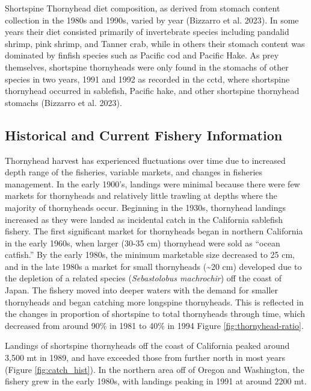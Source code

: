 \documentclass[11pt,
  english,
  letterpaper,
]{article}
\begin{document}
Shortspine Thornyhead diet composition, as derived from stomach content collection in the 1980s and 1990s, varied by year (Bizzarro et al. 2023). In some years their diet consisted primarily of invertebrate species including pandalid shrimp, pink shrimp, and Tanner crab, while in others their stomach content was dominated by finfish species such as Pacific cod and Pacific Hake. As prey themselves, shortspine thornyheads were only found in the stomachs of other species in two years, 1991 and 1992 as recorded in the \gls{cctd}, where shortspine thornyhead occurred in sablefish, Pacific hake, and other shortspine thornyhead stomachs (Bizzarro et al. 2023).

\hypertarget{historical-and-current-fishery-information}{%
\subsection{Historical and Current Fishery Information}\label{historical-and-current-fishery-information}}

Thornyhead harvest has experienced fluctuations over time due to increased depth range of the fisheries, variable markets, and changes in fisheries management. In the early 1900's, landings were minimal because there were few markets for thornyheads and relatively little trawling at depths where the majority of thornyheads occur. Beginning in the 1930s, thornyhead landings increased as they were landed as incidental catch in the California sablefish fishery. The first significant market for thornyheads began in northern California in the early 1960s, when larger (30-35 cm) thornyhead were sold as ``ocean catfish.'' By the early 1980s, the minimum marketable size decreased to 25 cm, and in the late 1980s a market for small thornyheads (\textasciitilde20 cm) developed due to the depletion of a related species (\emph{Sebastolobus machrochir}) off the coast of Japan. The fishery moved into deeper waters with the demand for smaller thornyheads and began catching more longspine thornyheads. This is reflected in the changes in proportion of shortspine to total thornyheads through time, which decreased from around 90\% in 1981 to 40\% in 1994 Figure \ref{fig:thornyhead-ratio}.

Landings of shortspine thornyheads off the coast of California peaked around 3,500 mt in 1989, and have exceeded those from further north in most years (Figure \ref{fig:catch_hist}). In the northern area off of Oregon and Washington, the fishery grew in the early 1980s, with landings peaking in 1991 at around 2200 mt.
\end{document}
